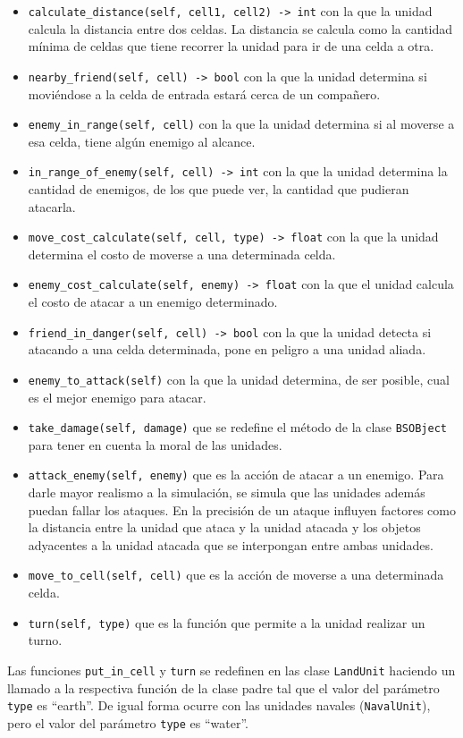 \begin{itemize}
	\item \verb|calculate_distance(self, cell1, cell2) -> int| con la que la unidad calcula la distancia entre dos celdas. La distancia se calcula como la cantidad m\'inima de celdas que tiene recorrer la unidad para ir de una celda a otra.
	\item \verb|nearby_friend(self, cell) -> bool| con la que la unidad determina si movi\'endose a la celda de entrada estar\'a cerca de un compa\~{n}ero.
	\item \verb|enemy_in_range(self, cell)| con la que la unidad determina si al moverse a esa celda, tiene alg\'un enemigo al alcance.
	\item \verb|in_range_of_enemy(self, cell) -> int| con la que la unidad determina la cantidad de enemigos, de los que puede ver, la cantidad que pudieran atacarla.
	\item \verb|move_cost_calculate(self, cell, type) -> float| con la que la unidad determina el costo de moverse a una determinada celda.
	\item \verb|enemy_cost_calculate(self, enemy) -> float| con la que el unidad calcula el costo de atacar a un enemigo determinado.
	\item \verb|friend_in_danger(self, cell) -> bool| con la que la unidad detecta si atacando a una celda determinada, pone en peligro a una unidad aliada.
	\item \verb|enemy_to_attack(self)| con la que la unidad determina, de ser posible, cual es el mejor enemigo para atacar.
	\item \verb|take_damage(self, damage)| que se redefine el m\'etodo de la clase \verb|BSOBject| para tener  en cuenta la moral de las unidades.
	\item \verb|attack_enemy(self, enemy)| que es la acci\'on de atacar a un enemigo. Para darle mayor realismo a la simulaci\'on, se simula que las unidades adem\'as puedan fallar los ataques. En la precisi\'on de un ataque influyen  factores como la distancia entre la unidad que ataca y la unidad atacada y los objetos adyacentes a la unidad atacada que se interpongan entre ambas unidades.
	\item \verb|move_to_cell(self, cell)| que es la acci\'on de moverse a una determinada celda.
	\item \verb|turn(self, type)| que es la funci\'on que permite a la unidad realizar un turno.
\end{itemize}

Las funciones \verb|put_in_cell| y \verb|turn| se redefinen en las clase \verb|LandUnit| haciendo un llamado a la respectiva funci\'on de la clase padre tal que el valor del par\'ametro \verb|type| es ``earth''. De igual forma ocurre con las unidades navales (\verb|NavalUnit|), pero el valor del par\'ametro \verb|type| es ``water''.


